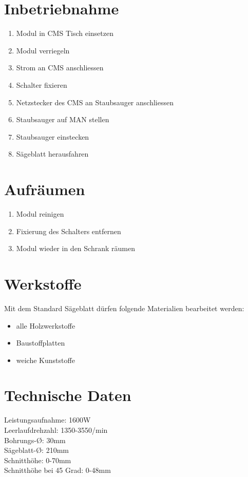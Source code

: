 \documentclass[10pt]{scrartcl}
\begin{document}
\section{Inbetriebnahme}
\begin{enumerate}
\item Modul in CMS Tisch einsetzen
\item Modul verriegeln
\item Strom an CMS anschliessen
\item Schalter fixieren
\item Netzstecker des CMS an Staubsauger anschliessen
\item Staubsauger auf MAN stellen
\item Staubsauger einstecken
\item Sägeblatt herausfahren
\end{enumerate}

\section{Aufräumen}
\begin{enumerate}
\item Modul reinigen
\item Fixierung des Schalters entfernen
\item Modul wieder in den Schrank räumen
\end{enumerate}


\section{Werkstoffe}
Mit dem Standard Sägeblatt dürfen folgende Materialien bearbeitet werden:
\begin{itemize}
\item alle Holzwerkstoffe
\item Baustoffplatten
\item weiche Kunststoffe
\end{itemize}

\section{Technische Daten}
Leistungsaufnahme: 1600W\\
Leerlaufdrehzahl: 1350-3550/min\\
Bohrungs-Ø: 30mm\\
Sägeblatt-Ø: 210mm\\
Schnitthöhe: 0-70mm\\
Schnitthöhe bei 45 Grad: 0-48mm\\


\end{document}
